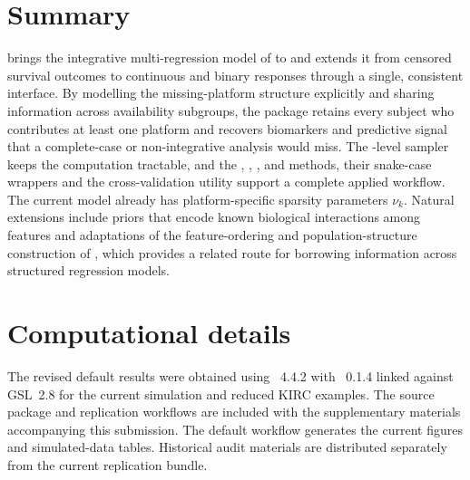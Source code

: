 \documentclass[article]{jss}
\begin{document}
\section{Summary}\label{sec:summary}

 brings the integrative multi-regression model of
\citet{chekouo2017} to  and extends it from censored survival
outcomes to continuous and binary responses through a single, consistent
interface. By modelling the missing-platform structure explicitly and sharing
information across availability subgroups, the package retains every subject who
contributes at least one platform and recovers biomarkers and predictive signal
that a complete-case or non-integrative analysis would miss. The
-level sampler keeps the computation tractable, and the
, , ,  and 
methods, their snake-case wrappers and the cross-validation utility support a
complete applied workflow. The current model already has platform-specific
sparsity parameters $\nu_k$. Natural extensions include priors that encode
known biological interactions among features and adaptations of the
feature-ordering and population-structure construction of \citet{dai2023},
which provides a related route for borrowing information across structured
regression models.

\section*{Computational details}
The revised default results were obtained using ~4.4.2 with
~0.1.4 linked against GSL~2.8 for the current simulation
and reduced KIRC examples. The source package and
replication workflows are included with the supplementary materials
accompanying this submission. The default workflow generates the current figures and simulated-data tables.
Historical audit materials are distributed separately from the current replication bundle.



\appendix
\renewcommand{\thetable}{\thesection.\arabic{table}}
\renewcommand{\thefigure}{\thesection.\arabic{figure}}
\renewcommand{\theequation}{\thesection.\arabic{equation}}
\renewcommand{\theHtable}{appendix.\thesection.\arabic{table}}
\renewcommand{\theHfigure}{appendix.\thesection.\arabic{figure}}
\setcounter{table}{0}
\setcounter{figure}{0}
\setcounter{equation}{0}
\end{document}
